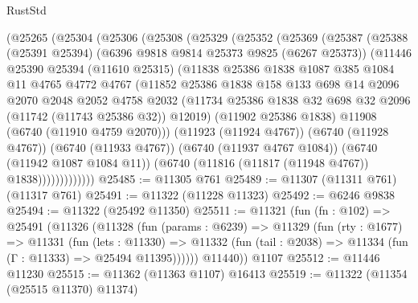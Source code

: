 \begin{lexlean}{RustStd}
\begin{coremodule}
    (@25265
      (@25304
        (@25306
          (@25308
            (@25329
              (@25352
                (@25369
                  (@25387
                    (@25388
                      (@25391 @25394)
                      (@6396 @9818 @9814 @25373 @9825 (@6267 @25373))
                      (@11446
                        @25390
                        @25394
                        (@11610 @25315)
                        (@11838
                          @25386
                          @1838
                          @1087
                          @385
                          @1084
                          @11
                          @4765
                          @4772
                          @4767
                          (@11852
                            @25386
                            @1838
                            @158
                            @133
                            @698
                            @14
                            @2096
                            @2070
                            @2048
                            @2052
                            @4758
                            @2032
                            (@11734
                              @25386
                              @1838
                              @32
                              @698
                              @32
                              @2096
                              (@11742 (@11743 @25386 @32))
                              @12019)
                            (@11902 @25386 @1838)
                            @11908
                            (@6740 (@11910 @4759 @2070)))
                          (@11923 (@11924 @4767))
                          (@6740 (@11928 @4767))
                          (@6740 (@11933 @4767))
                          (@6740 (@11937 @4767 @1084))
                          (@6740 (@11942 @1087 @1084 @11))
                          (@6740 (@11816 (@11817 (@11948 @4767)) @1838)))))))))))))
@25485 := @11305 @761
@25489 := @11307 (@11311 @761) (@11317 @761)
@25491 := @11322 (@11228 @11323)
@25492 := @6246 @9838
@25494 := @11322 (@25492 @11350)
@25511 := @11321
    (fun (fn : @102) =>
    @25491
      (@11326
        (@11328
          (fun (params : @6239) =>
          @11329
            (fun (rty : @1677) =>
            @11331
              (fun (lets : @11330) =>
              @11332 (fun (tail : @2038) => @11334 (fun (Γ : @11333) => @25494 @11395))))))
        @11440))
    @1107
@25512 := @11446 @11230
@25515 := @11362 (@11363 @1107) @16413
@25519 := @11322 (@11354 (@25515 @11370) @11374)

\end{coremodule}
\end{lexlean}
